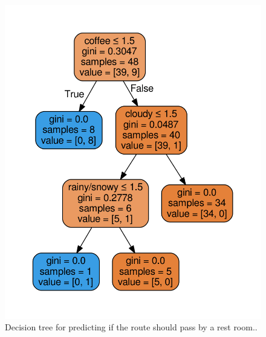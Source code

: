 \documentclass{sigchi}
\begin{document}
\begin{figure}[!h]
\centering
\includegraphics[width=0.7\columnwidth]{pics/decisionTree_6.png}
\caption{Decision tree for predicting if the route should pass by a rest room..}
\label{fig:dt6}
\end{figure}
\end{document}
